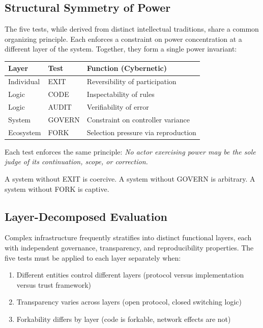 \documentclass{article}
\begin{document}
\subsection{Structural Symmetry of Power}

The five tests, while derived from distinct intellectual traditions, share a common organizing principle. Each enforces a constraint on power concentration at a different layer of the system. Together, they form a single power invariant:

\begin{center}
\begin{tabular}{@{}lll@{}}
\toprule
\textbf{Layer} & \textbf{Test} & \textbf{Function (Cybernetic)} \\
\midrule
Individual & EXIT & Reversibility of participation \\
Logic & CODE & Inspectability of rules \\
Logic & AUDIT & Verifiability of error \\
System & GOVERN & Constraint on controller variance \\
Ecosystem & FORK & Selection pressure via reproduction \\
\bottomrule
\end{tabular}
\end{center}

Each test enforces the same principle: \textit{No actor exercising power may be the sole judge of its continuation, scope, or correction.}

A system without EXIT is coercive. A system without GOVERN is arbitrary. A system without FORK is captive.

\subsection{Layer-Decomposed Evaluation}
\label{subsec:layers}

Complex infrastructure frequently stratifies into distinct functional layers, each with independent governance, transparency, and reproducibility properties. The five tests must be applied to each layer separately when:

\begin{enumerate}[noitemsep,topsep=0pt]
    \item Different entities control different layers (protocol versus implementation versus trust framework)
    \item Transparency varies across layers (open protocol, closed switching logic)
    \item Forkability differs by layer (code is forkable, network effects are not)
\end{enumerate}
\end{document}

